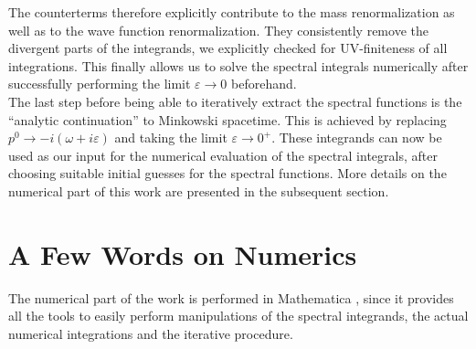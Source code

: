 The counterterms therefore explicitly contribute to the mass renormalization as well as to the wave function renormalization. They consistently remove the divergent parts of the integrands, we explicitly checked for UV-finiteness of all integrations. This finally allows us to solve the spectral integrals numerically after successfully performing the limit $\varepsilon\rightarrow 0$ beforehand. \\
The last step before being able to iteratively extract the spectral functions is the \enquote{analytic continuation} to Minkowski spacetime. This is achieved by replacing $p^0\rightarrow -i(\omega + i\varepsilon)$ and taking the limit $\varepsilon\rightarrow 0^+$. 
These integrands can now be used as our input for the numerical evaluation of the spectral integrals, after choosing suitable initial guesses for the spectral functions. More details on the numerical part of this work are presented in the subsequent section.\\
\section{A Few Words on Numerics}
The numerical part of the work is performed in Mathematica \cite{Mathematica}, since it provides all the tools to easily perform manipulations of the spectral integrands, the actual numerical integrations and the iterative procedure. \\

